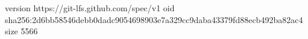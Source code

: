 version https://git-lfs.github.com/spec/v1
oid sha256:2d6bb58546debb0dadc9054698903e7a329cc9daba43379fd88ecb492ba82ac4
size 5566
